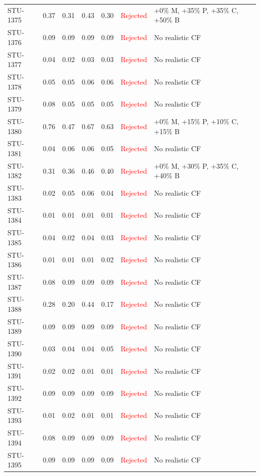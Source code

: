 \begin{longtable}{l c c c c | c | l}
STU-1375 & 0.37 & 0.31 & 0.43 & 0.30 & \textcolor{red}{Rejected} & +0\% M, +35\% P, +35\% C, +50\% B \\
STU-1376 & 0.09 & 0.09 & 0.09 & 0.09 & \textcolor{red}{Rejected} & No realistic CF \\
STU-1377 & 0.04 & 0.02 & 0.03 & 0.03 & \textcolor{red}{Rejected} & No realistic CF \\
STU-1378 & 0.05 & 0.05 & 0.06 & 0.06 & \textcolor{red}{Rejected} & No realistic CF \\
STU-1379 & 0.08 & 0.05 & 0.05 & 0.05 & \textcolor{red}{Rejected} & No realistic CF \\
STU-1380 & 0.76 & 0.47 & 0.67 & 0.63 & \textcolor{red}{Rejected} & +0\% M, +15\% P, +10\% C, +15\% B \\
STU-1381 & 0.04 & 0.06 & 0.06 & 0.05 & \textcolor{red}{Rejected} & No realistic CF \\
STU-1382 & 0.31 & 0.36 & 0.46 & 0.40 & \textcolor{red}{Rejected} & +0\% M, +30\% P, +35\% C, +40\% B \\
STU-1383 & 0.02 & 0.05 & 0.06 & 0.04 & \textcolor{red}{Rejected} & No realistic CF \\
STU-1384 & 0.01 & 0.01 & 0.01 & 0.01 & \textcolor{red}{Rejected} & No realistic CF \\
STU-1385 & 0.04 & 0.02 & 0.04 & 0.03 & \textcolor{red}{Rejected} & No realistic CF \\
STU-1386 & 0.01 & 0.01 & 0.01 & 0.02 & \textcolor{red}{Rejected} & No realistic CF \\
STU-1387 & 0.08 & 0.09 & 0.09 & 0.09 & \textcolor{red}{Rejected} & No realistic CF \\
STU-1388 & 0.28 & 0.20 & 0.44 & 0.17 & \textcolor{red}{Rejected} & No realistic CF \\
STU-1389 & 0.09 & 0.09 & 0.09 & 0.09 & \textcolor{red}{Rejected} & No realistic CF \\
STU-1390 & 0.03 & 0.04 & 0.04 & 0.05 & \textcolor{red}{Rejected} & No realistic CF \\
STU-1391 & 0.02 & 0.02 & 0.01 & 0.01 & \textcolor{red}{Rejected} & No realistic CF \\
STU-1392 & 0.09 & 0.09 & 0.09 & 0.09 & \textcolor{red}{Rejected} & No realistic CF \\
STU-1393 & 0.01 & 0.02 & 0.01 & 0.01 & \textcolor{red}{Rejected} & No realistic CF \\
STU-1394 & 0.08 & 0.09 & 0.09 & 0.09 & \textcolor{red}{Rejected} & No realistic CF \\
STU-1395 & 0.09 & 0.09 & 0.09 & 0.09 & \textcolor{red}{Rejected} & No realistic CF \\

\end{longtable}
